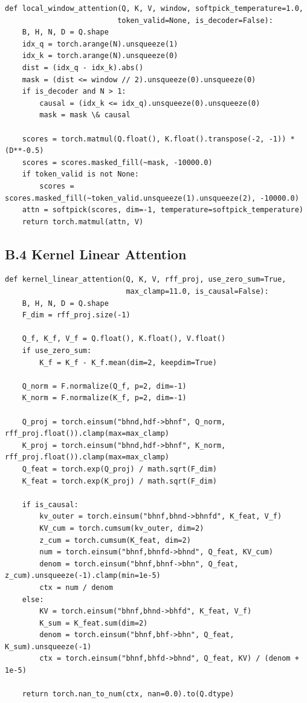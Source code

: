 \begin{lstlisting}
def local_window_attention(Q, K, V, window, softpick_temperature=1.0, 
                          token_valid=None, is_decoder=False):
    B, H, N, D = Q.shape
    idx_q = torch.arange(N).unsqueeze(1)
    idx_k = torch.arange(N).unsqueeze(0)
    dist = (idx_q - idx_k).abs()
    mask = (dist <= window // 2).unsqueeze(0).unsqueeze(0)
    if is_decoder and N > 1:
        causal = (idx_k <= idx_q).unsqueeze(0).unsqueeze(0)
        mask = mask \& causal
    
    scores = torch.matmul(Q.float(), K.float().transpose(-2, -1)) * (D**-0.5)
    scores = scores.masked_fill(~mask, -10000.0)
    if token_valid is not None:
        scores = scores.masked_fill(~token_valid.unsqueeze(1).unsqueeze(2), -10000.0)
    attn = softpick(scores, dim=-1, temperature=softpick_temperature)
    return torch.matmul(attn, V)
\end{lstlisting}

\subsection{B.4 Kernel Linear Attention}

\begin{lstlisting}
def kernel_linear_attention(Q, K, V, rff_proj, use_zero_sum=True, 
                            max_clamp=11.0, is_causal=False):
    B, H, N, D = Q.shape
    F_dim = rff_proj.size(-1)
    
    Q_f, K_f, V_f = Q.float(), K.float(), V.float()
    if use_zero_sum:
        K_f = K_f - K_f.mean(dim=2, keepdim=True)
    
    Q_norm = F.normalize(Q_f, p=2, dim=-1)
    K_norm = F.normalize(K_f, p=2, dim=-1)
    
    Q_proj = torch.einsum("bhnd,hdf->bhnf", Q_norm, rff_proj.float()).clamp(max=max_clamp)
    K_proj = torch.einsum("bhnd,hdf->bhnf", K_norm, rff_proj.float()).clamp(max=max_clamp)
    Q_feat = torch.exp(Q_proj) / math.sqrt(F_dim)
    K_feat = torch.exp(K_proj) / math.sqrt(F_dim)
    
    if is_causal:
        kv_outer = torch.einsum("bhnf,bhnd->bhnfd", K_feat, V_f)
        KV_cum = torch.cumsum(kv_outer, dim=2)
        z_cum = torch.cumsum(K_feat, dim=2)
        num = torch.einsum("bhnf,bhnfd->bhnd", Q_feat, KV_cum)
        denom = torch.einsum("bhnf,bhnf->bhn", Q_feat, z_cum).unsqueeze(-1).clamp(min=1e-5)
        ctx = num / denom
    else:
        KV = torch.einsum("bhnf,bhnd->bhfd", K_feat, V_f)
        K_sum = K_feat.sum(dim=2)
        denom = torch.einsum("bhnf,bhf->bhn", Q_feat, K_sum).unsqueeze(-1)
        ctx = torch.einsum("bhnf,bhfd->bhnd", Q_feat, KV) / (denom + 1e-5)
    
    return torch.nan_to_num(ctx, nan=0.0).to(Q.dtype)
\end{lstlisting}


